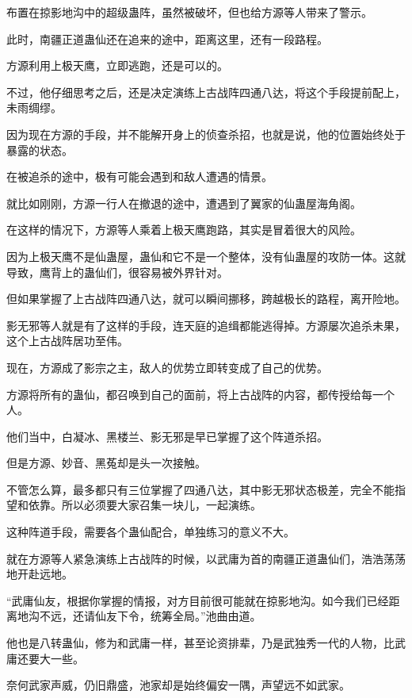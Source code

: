 
\begin{this_body}

布置在掠影地沟中的超级蛊阵，虽然被破坏，但也给方源等人带来了警示。

此时，南疆正道蛊仙还在追来的途中，距离这里，还有一段路程。

方源利用上极天鹰，立即逃跑，还是可以的。

不过，他仔细思考之后，还是决定演练上古战阵四通八达，将这个手段提前配上，未雨绸缪。

因为现在方源的手段，并不能解开身上的侦查杀招，也就是说，他的位置始终处于暴露的状态。

在被追杀的途中，极有可能会遇到和敌人遭遇的情景。

就比如刚刚，方源一行人在撤退的途中，遭遇到了翼家的仙蛊屋海角阁。

在这样的情况下，方源等人乘着上极天鹰跑路，其实是冒着很大的风险。

因为上极天鹰不是仙蛊屋，蛊仙和它不是一个整体，没有仙蛊屋的攻防一体。这就导致，鹰背上的蛊仙们，很容易被外界针对。

但如果掌握了上古战阵四通八达，就可以瞬间挪移，跨越极长的路程，离开险地。

影无邪等人就是有了这样的手段，连天庭的追缉都能逃得掉。方源屡次追杀未果，这个上古战阵居功至伟。

现在，方源成了影宗之主，敌人的优势立即转变成了自己的优势。

方源将所有的蛊仙，都召唤到自己的面前，将上古战阵的内容，都传授给每一个人。

他们当中，白凝冰、黑楼兰、影无邪是早已掌握了这个阵道杀招。

但是方源、妙音、黑菟却是头一次接触。

不管怎么算，最多都只有三位掌握了四通八达，其中影无邪状态极差，完全不能指望和依靠。所以必须要大家召集一块儿，一起演练。

这种阵道手段，需要各个蛊仙配合，单独练习的意义不大。

就在方源等人紧急演练上古战阵的时候，以武庸为首的南疆正道蛊仙们，浩浩荡荡地开赴远地。

“武庸仙友，根据你掌握的情报，对方目前很可能就在掠影地沟。如今我们已经距离地沟不远，还请仙友下令，统筹全局。”池曲由道。

他也是八转蛊仙，修为和武庸一样，甚至论资排辈，乃是武独秀一代的人物，比武庸还要大一些。

奈何武家声威，仍旧鼎盛，池家却是始终偏安一隅，声望远不如武家。


\end{this_body}
